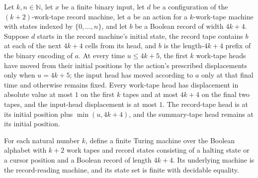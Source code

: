 \begin{lemma}
\label{Turing.StepBlock.recordTM_envelope}
\leanok
{}
Let $k,n\in\mathbb N$, let $x$ be a finite binary input, let $d$ be a configuration of
the $(k+2)$-work-tape record machine, let $a$ be an action for a $k$-work-tape machine
with states indexed by $\{0,\ldots,n\}$, and let $b$ be a Boolean record of width
$4k+4$. Suppose $d$ starts in the record machine's initial state, the record tape
contains $b$ at each of the next $4k+4$ cells from its head, and $b$ is the
length-$4k+4$ prefix of the binary encoding of $a$. At every time $u\le 4k+5$, the first
$k$ work-tape heads have moved from their initial positions by the action's prescribed
displacements only when $u=4k+5$; the input head has moved according to $a$ only at that
final time and otherwise remains fixed. Every work-tape head has displacement in
absolute value at most $1$ on the first $k$ tapes and at most $4k+4$ on the final two
tapes, and the input-head displacement is at most $1$. The record-tape head is at its
initial position plus $\min(u,4k+4)$, and the summary-tape head remains at its initial
position.
\end{lemma}

\begin{definition}
\label{Turing.StepBlock.recordFinTM}
\leanok
{}
For each natural number $k$, define a finite Turing machine over the Boolean alphabet
with $k+2$ work tapes and record states consisting of a halting state or a cursor
position and a Boolean record of length $4k+4$. Its underlying machine is the
record-reading machine, and its state set is finite with decidable equality.
\end{definition}

